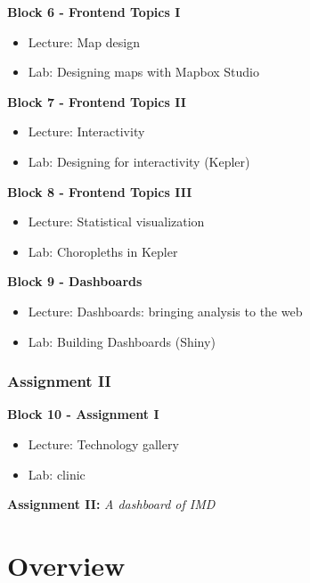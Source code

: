 \documentclass[
  letterpaper,
  DIV=11,
  numbers=noendperiod]{scrreprt}
\begin{document}
\textbf{Block 6 - Frontend Topics I}

\begin{itemize}
\item
  Lecture: Map design
\item
  Lab: Designing maps with Mapbox Studio
\end{itemize}

\textbf{Block 7 - Frontend Topics II}

\begin{itemize}
\item
  Lecture: Interactivity
\item
  Lab: Designing for interactivity (Kepler)
\end{itemize}

\textbf{Block 8 - Frontend Topics III}

\begin{itemize}
\item
  Lecture: Statistical visualization
\item
  Lab: Choropleths in Kepler
\end{itemize}

\textbf{Block 9 - Dashboards}

\begin{itemize}
\item
  Lecture: Dashboards: bringing analysis to the web
\item
  Lab: Building Dashboards (Shiny)
\end{itemize}

\hypertarget{assignment-ii}{%
\subsection*{Assignment II}\label{assignment-ii}}

\textbf{Block 10 - Assignment I}

\begin{itemize}
\item
  Lecture: Technology gallery
\item
  Lab: clinic
\end{itemize}

\textbf{Assignment II:} \emph{A dashboard of IMD}


\hypertarget{overview}{%
\chapter*{Overview}\label{overview}}
\end{document}
